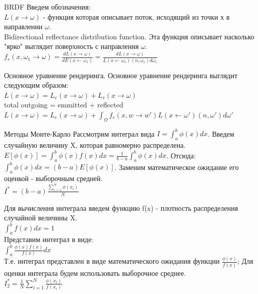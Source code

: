 \documentclass{beamer}
\begin{document}
\begin{frame}{BRDF}
	Введем обозначения:\\
	$L(x\rightarrow\omega)$ - функция которая описывает поток, исходящий из точки х в направлении $\omega$.\\
	Bidirectional reflectance distribution function. Эта функция описывает насколько "ярко" выглядит поверхность с направления $\omega$.\\
	$f_r(x, \omega_1\rightarrow\omega) = \frac{dL(x\rightarrow\omega)}{dE(x\leftarrow\omega_1)} = \frac{dL(x\rightarrow\omega)}{L(x\leftarrow\omega_1)(n,\omega_1)d\omega_1}$
	
\end{frame}

\begin{frame}{Основное уравнение рендеринга.}
	Основное уравнение рендеринга выглядит следующим образом:\\
	$L(x\rightarrow\omega) = L_e(x\rightarrow\omega) + L_r(x\rightarrow\omega)$\\
	total outgoing = emmitted + reflected\\
	$L(x\rightarrow\omega) = L_e(x\rightarrow\omega) + \int_{\Omega}f_r(x,w \rightarrow w')L(x\leftarrow\omega')(n,\omega')d\omega'$
\end{frame}
\begin{frame}{Методы Монте-Карло}
	Рассмотрим интеграл вида $I = \int_a^b\phi(x)dx$. Введем случайную величину X, которая равномерно распределена. \\
	$E[\phi(x)] = \int_a^b\phi(x)f(x)dx = \frac{1}{b - a}\int_a^b\phi(x)dx$. Отсюда:
	\\$\int_a^b\phi(x)dx = (b - a)E[\phi(x)]$. Заменим математическое ожидание его оценкой - выборочным средней.
	\\$I^* = (b - a)\frac{\sum\limits_{i = 1}^N \phi(x_i)}{N}$
\end{frame}
\begin{frame}
	Для вычисления интеграла введем функцию f(x) - плотность распределения случайной величины X. \\
	$\int_a^bf(x)dx = 1$\\
	Представим интеграл в виде:\\
	$\int_a^b \frac{\phi(x)f(x)}{f(x)}dx$\\
	Т.е. интеграл представлен в виде математического ожидания функции $\frac{\phi(x)}{f(x)}$;
	Для оценки интеграла будем использовать выборочное среднее. \\
	$I^*_2 = \frac{1}{N}\sum\limits_{i = 1}^N\frac{\phi(x_i)}{f(x_i)}$ 
\end{frame}
\end{document}
